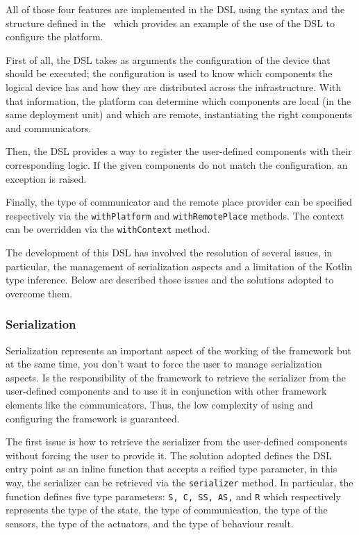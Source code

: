All of those four features are implemented in the DSL using the syntax and the structure defined in the~ which provides
an example of the use of the DSL to configure the platform.



First of all, the DSL takes as arguments the configuration of the device that should be executed; the configuration is used to know which components
the logical device has and how they are distributed across the infrastructure. With that information, the platform can determine which components
are local (in the same deployment unit) and which are remote, instantiating the right components and communicators.

Then, the DSL provides a way to register the user-defined components with their corresponding logic. If the given components do not match the
configuration, an exception is raised.

Finally, the type of communicator and the remote place provider can be specified respectively via the \texttt{withPlatform} and
\texttt{withRemotePlace} methods. The context can be overridden via the \texttt{withContext} method.

The development of this DSL has involved the resolution of several issues, in particular, the management of serialization aspects and a limitation of
the Kotlin type inference. Below are described those issues and the solutions adopted to overcome them.

\subsubsection{Serialization}

Serialization represents an important aspect of the working of the framework but at the same time, you don't want to force the user to manage
serialization aspects. Is the responsibility of the framework to retrieve the serializer from the user-defined components and to use it in
conjunction with other framework elements like the communicators. Thus, the low complexity of using and configuring the framework is guaranteed.

The first issue is how to retrieve the serializer from the user-defined components without forcing the user to provide it. The solution adopted
defines the DSL entry point as an inline function that accepts a reified type parameter, in this way, the serializer can be retrieved via the
\texttt{serializer} method. In particular, the function defines five type parameters: \texttt{S, C, SS, AS,} and \texttt{R} which respectively
represents the type of the state, the type of communication, the type of the sensors, the type of the actuators, and the type of behaviour result.

